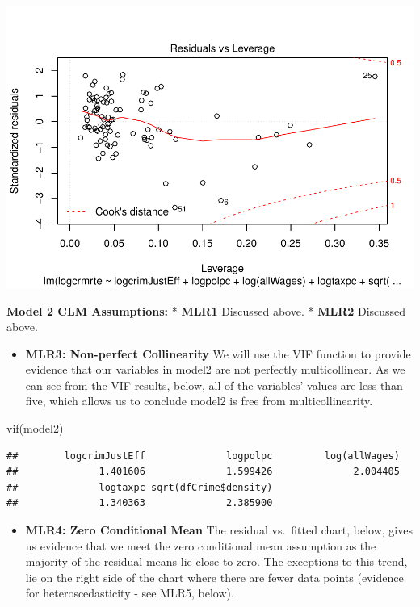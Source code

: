 \documentclass[]{article}
\newenvironment{Shaded}{}{}
\newcommand{\KeywordTok}[1]{\textcolor[rgb]{0.00,0.00,1.00}{#1}}
\newcommand{\NormalTok}[1]{#1}
\providecommand{\tightlist}{%
  \setlength{\itemsep}{0pt}\setlength{\parskip}{0pt}}
\begin{document}
\includegraphics{Bagnard_Gaustad_Hartman_Leung_Lab_3_files/figure-latex/unnamed-chunk-91-4.pdf}

\textbf{Model 2 CLM Assumptions:} * \textbf{MLR1} Discussed above. *
\textbf{MLR2} Discussed above.

\begin{itemize}
\tightlist
\item
  \textbf{MLR3: Non-perfect Collinearity} We will use the VIF function
  to provide evidence that our variables in model2 are not perfectly
  multicollinear. As we can see from the VIF results, below, all of the
  variables' values are less than five, which allows us to conclude
  model2 is free from multicollinearity.
\end{itemize}

\begin{Shaded}
\begin{Highlighting}[]
\KeywordTok{vif}\NormalTok{(model2)}
\end{Highlighting}
\end{Shaded}

\begin{verbatim}
##        logcrimJustEff              logpolpc         log(allWages) 
##              1.401606              1.599426              2.004405 
##              logtaxpc sqrt(dfCrime$density) 
##              1.340363              2.385900
\end{verbatim}

\begin{itemize}
\tightlist
\item
  \textbf{MLR4: Zero Conditional Mean} The residual vs.~fitted chart,
  below, gives us evidence that we meet the zero conditional mean
  assumption as the majority of the residual means lie close to zero.
  The exceptions to this trend, lie on the right side of the chart where
  there are fewer data points (evidence for heteroscedasticity - see
  MLR5, below).
\end{itemize}
\end{document}
